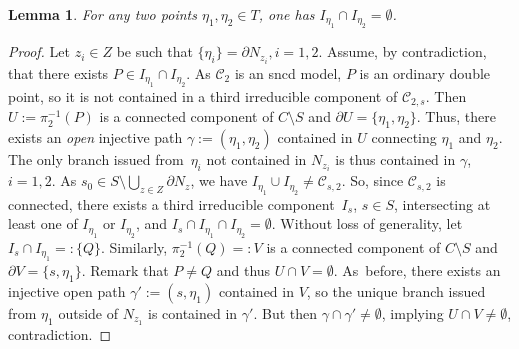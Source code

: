 \documentclass[JEP,XML,SOM,Unicode,NoFloatCountersInSection,published]{cedram}
\let\backslash\setminus
\newtheorem{lm}[thm]{Lemma}
\theoremstyle{definition}
\begin{document}
\begin{lm} \label{shtesa}
For any two points $\eta_1, \eta_2 \in T$, one has $I_{\eta_1} \cap I_{\eta_2}=\emptyset$.
\end{lm}

\begin{proof} Let $z_i \in Z$ be such that $\{\eta_i\}=\partial{N_{z_i}}, i=1,2$.
Assume, by contradiction, that there exists $P \in I_{\eta_1} \cap I_{\eta_2}$. As $\mathscr{C}_2$ is an sncd model, $P$ is an ordinary double point, so it is not contained in a third irreducible component of $\mathscr{C}_{2,s}$. Then $U:=\pi_2^{-1}(P)$ is a connected component of $C \backslash S$ and $\partial{U}=\{\eta_1, \eta_2\}$. Thus, there exists an \emph{open} injective path $\gamma:=(\eta_1, \eta_2)$ contained in $U$ connecting $\eta_1$ and $\eta_2$. The only branch issued from~$\eta_i$ not contained in $N_{z_i}$ is thus contained in $\gamma$, $i=1,2$. As $s_0 \in S \backslash \bigcup_{z \in Z} \partial{N_z}$, we have $I_{\eta_1} \cup I_{\eta_2} \neq \mathscr{C}_{s,2}$.
So, since $\mathscr{C}_{s,2}$ is connected, there exists a third irreducible component~$I_s$, $s\in S$, intersecting at least one of $I_{\eta_1}$ or $I_{\eta_2}$, and $I_s \cap I_{\eta_1} \cap I_{\eta_2}=\emptyset$. Without loss of generality, let $I_s \cap I_{\eta_1}=:\{Q\}$. Similarly, $\pi_2^{-1}(Q)=:V$ is a connected component of $C \backslash S$ and $\partial{V}=\{s, \eta_1\}$. Remark that $P \neq Q$ and thus $U \cap V=\emptyset$. As~before, there exists an injective open path $\gamma':=(s, \eta_1)$ contained in $V$, so the unique branch issued from $\eta_1$ outside of $N_{z_1}$ is contained in $\gamma'$. But then $\gamma \cap \gamma' \neq \emptyset$, implying $U \cap V \neq \emptyset$, contradiction.
\end{proof}
\end{document}
